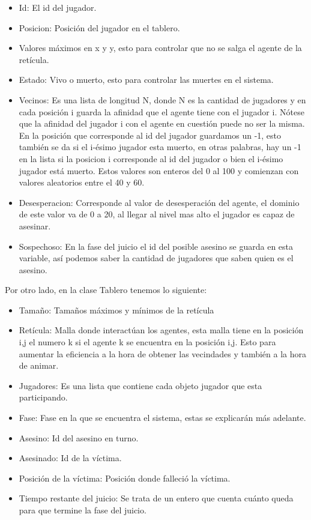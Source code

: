\documentclass[11pt,letterpaper]{article}
\begin{document}
\begin{itemize}
	\item Id: El id del jugador.
	\item Posicion: Posición del jugador en el tablero.
	\item Valores máximos en x y y, esto para controlar que no se salga el agente
	de la retícula.
	\item Estado: Vivo o muerto, esto para controlar las muertes en el sistema.
	\item Vecinos: Es una lista de longitud N, donde N es la cantidad de jugadores
	y en cada posición i guarda la afinidad que el agente tiene con el jugador i. Nótese que la afinidad del jugador i con el agente en cuestión puede no ser la
	misma. En la posición que corresponde al id del jugador guardamos un -1, esto 
	también se da si el i-ésimo jugador esta muerto, en otras palabras, hay un -1 en la lista si la posicion i corresponde al id del jugador o bien el i-ésimo jugador está muerto. Estos valores son enteros del 0 al 100 y comienzan con valores aleatorios entre el 40 y 60.
	\item Desesperacion: Corresponde al valor de desesperación del agente, el 
	dominio de este valor va de 0 a 20, al llegar al nivel mas alto el jugador 
	es capaz de asesinar.
	\item Sospechoso: En la fase del juicio el id del posible asesino se guarda en
	esta variable, así podemos saber la cantidad de jugadores que saben quien es el asesino.
\end{itemize}

Por otro lado, en la clase Tablero tenemos lo siguiente:

\begin{itemize}
	\item Tamaño: Tamaños máximos y mínimos de la retícula
	\item Retícula: Malla donde interactúan los agentes, esta malla tiene en 
	la posición i,j el numero k si el agente k se encuentra en la posición i,j.
	Esto para aumentar la eficiencia a la hora de obtener las vecindades y también
	a la hora de animar.
	\item Jugadores: Es una lista que contiene cada objeto jugador que esta participando.
	\item Fase: Fase en la que se encuentra el sistema, estas se explicarán más adelante.
	\item Asesino: Id del asesino en turno.
	\item Asesinado: Id de la víctima.
	\item Posición de la víctima: Posición donde falleció la víctima.
	\item Tiempo restante del juicio: Se trata de un entero que cuenta cuánto queda
	para que termine la fase del juicio.
\end{itemize}
\end{document}

